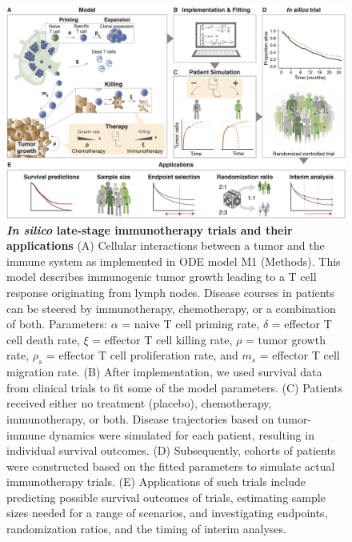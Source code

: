 \documentclass[a4paper,10pt]{article}
\begin{document}
\begin{figure}

\includegraphics[width=\textwidth]{figures-prepared/schematic_overview_v1.2.png}

\internallinenumbers\caption{
{\bfseries \emph{In silico} late-stage immunotherapy trials and their applications}
	(A) Cellular interactions between a tumor and the immune system as implemented in 
	ODE model M1 (Methods). This model describes immunogenic tumor growth leading to
	a T cell response originating from lymph nodes. Disease courses in
	patients can be steered by immunotherapy, chemotherapy, or a
	combination of both. Parameters: $ \alpha $ = naive T cell priming rate, $\delta$ =
	effector T cell death rate, $ \xi $ = effector T cell killing rate, $ \rho $ = tumor
	growth rate, $ \rho_s $ = effector T cell proliferation rate, and $ m_s $ = effector
	T cell migration rate. (B) After implementation, we used survival data from clinical
	trials to fit some of the model parameters. 
	(C) Patients received either no treatment (placebo),
	chemotherapy, immunotherapy, or both. Disease trajectories based on
	tumor-immune dynamics were simulated for each patient, resulting in
	individual survival outcomes. (D) Subsequently, cohorts of patients
	were constructed based on the fitted parameters to simulate actual
	immunotherapy trials. (E) Applications of such trials include
	predicting possible survival outcomes of trials, estimating sample
	sizes needed for a range of scenarios, and investigating endpoints, randomization ratios, and 
	the timing of interim analyses.
	}
	\label{fig:fig1}
\end{figure}
\end{document}
